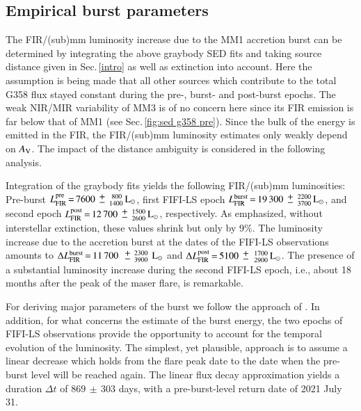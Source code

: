 \subsection{Empirical burst parameters}\label{ebp}
The FIR/(sub)mm luminosity increase due to the MM1 accretion burst can be determined by integrating the above graybody SED fits and taking source distance given in Sec.\,\ref{intro} as well as extinction into account. Here the assumption is being made that all other sources which contribute to the total G358 flux stayed constant during the pre\nobreakdash-, burst- and post-burst epochs.
The weak NIR/MIR variability of MM3 is of no concern here since its FIR emission is far below that of MM1 (see Sec.\,\ref{fig:sed g358 pre}).
Since the bulk of the energy is emitted in the FIR, the FIR/(sub)mm luminosity estimates only weakly depend on $ A_{\rm V}$. 
The impact of the distance ambiguity is considered in the following analysis.

Integration of the graybody fits yields the following FIR/(sub)mm luminosities: 
Pre-burst $L^{\rm pre}_{\rm FIR}\,{=}\,7600\,{\mypm}\,^{~800}_{1400}\,{\rm L}_\odot$, first FIFI-LS epoch $L^{\rm burst}_{\rm FIR}\,{=}\,19\,300\,{\mypm}\,^{2200}_{3700}\,{\rm L}_\odot$, and second epoch $L^{\rm post}_{\rm FIR}\,{=}\,12\,700\,{\mypm}\,^{1500}_{2600}\,{\rm L}_\odot$, respectively. 
As emphasized, without interstellar extinction, these values shrink but only by 9\%.
The luminosity increase due to the accretion burst at the dates of the FIFI-LS observations amounts to $\Delta L^{{\rm burst}}_{\rm FIR}\,{=}\,11\,700\,\mypm^{\,2300}_{\,3900}\,{\rm L}_\odot$ and $\Delta L^{{\rm post}}_{\rm FIR}\,{=}\,5100\,{\mypm}\,^{\,1700}_{\,2900}\,{\rm L}_\odot$. The presence of a substantial luminosity increase during the second FIFI-LS epoch, i.e., about 18 months after the peak of the maser flare, is remarkable.

For deriving major parameters of the burst we follow the approach of \citet{2017NatPh..13..276C}. In addition, for what concerns the estimate of the burst energy, the two epochs of FIFI-LS observations provide the opportunity to account for the temporal evolution of the luminosity. The simplest, yet plausible, approach is to assume a linear decrease which holds from the flare peak date to the date when the pre-burst level will be reached again. The linear flux decay approximation yields a duration $\Delta t$ of $869\,{\pm}\,303$ days, with a pre-burst-level return date of 2021 July 31.

